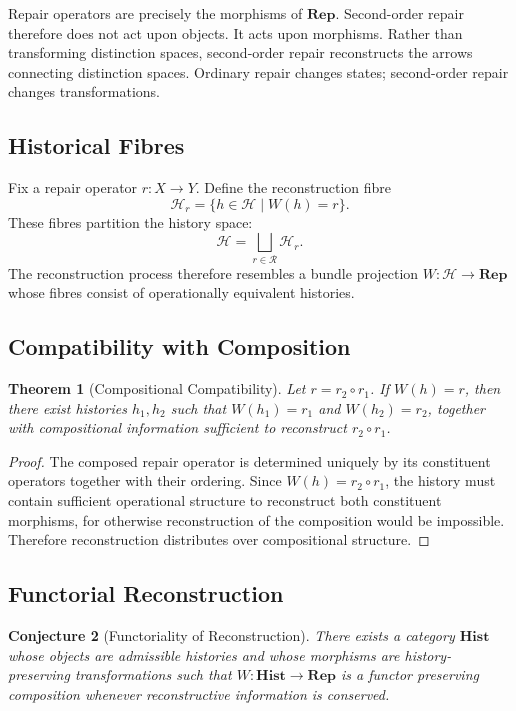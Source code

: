 \documentclass[12pt,oneside]{article}
\theoremstyle{plain}
\newtheorem{theorem}{Theorem}[section]
\theoremstyle{definition}
\theoremstyle{remark}
\theoremstyle{plain}
\newtheorem{conjecture}[theorem]{Conjecture}
\newcommand{\Hist}{\mathcal{H}}
\begin{document}
Repair operators are precisely the morphisms of $\mathbf{Rep}$. Second-order repair therefore does
not act upon objects. It acts upon morphisms. Rather than transforming distinction spaces,
second-order repair reconstructs the arrows connecting distinction spaces. Ordinary repair changes
states; second-order repair changes transformations.

\subsection{Historical Fibres}

Fix a repair operator $r : X \rightarrow Y$. Define the reconstruction fibre
\[
\mathcal{H}_r = \{h \in \Hist \mid W(h) = r\}.
\]
These fibres partition the history space:
\[
\Hist = \bigsqcup_{r \in \mathcal{R}} \mathcal{H}_r.
\]
The reconstruction process therefore resembles a bundle projection $W : \Hist \rightarrow
\mathbf{Rep}$ whose fibres consist of operationally equivalent histories.

\subsection{Compatibility with Composition}

\begin{theorem}[Compositional Compatibility]
Let $r = r_2 \circ r_1$. If $W(h) = r$, then there exist histories $h_1, h_2$ such that
$W(h_1) = r_1$ and $W(h_2) = r_2$, together with compositional information sufficient to
reconstruct $r_2 \circ r_1$.
\end{theorem}

\begin{proof}
The composed repair operator is determined uniquely by its constituent operators together with
their ordering. Since $W(h) = r_2 \circ r_1$, the history must contain sufficient operational
structure to reconstruct both constituent morphisms, for otherwise reconstruction of the composition
would be impossible. Therefore reconstruction distributes over compositional structure.
\end{proof}

\subsection{Functorial Reconstruction}

\begin{conjecture}[Functoriality of Reconstruction]
There exists a category $\mathbf{Hist}$ whose objects are admissible histories and whose morphisms
are history-preserving transformations such that $W : \mathbf{Hist} \rightarrow \mathbf{Rep}$ is a
functor preserving composition whenever reconstructive information is conserved.
\end{conjecture}
\end{document}
